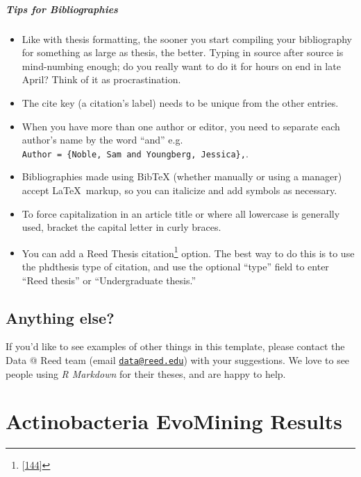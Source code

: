 \documentclass[12pt,twoside]{reedthesis}
\providecommand{\tightlist}{%
  \setlength{\itemsep}{0pt}\setlength{\parskip}{0pt}}
\begin{document}
  \paragraph{Tips for Bibliographies}\label{tips-for-bibliographies}
  
  \begin{itemize}
  \tightlist
  \item
    Like with thesis formatting, the sooner you start compiling your
    bibliography for something as large as thesis, the better. Typing in
    source after source is mind-numbing enough; do you really want to do
    it for hours on end in late April? Think of it as procrastination.
  \item
    The cite key (a citation's label) needs to be unique from the other
    entries.
  \item
    When you have more than one author or editor, you need to separate
    each author's name by the word ``and'' e.g.
    \texttt{Author\ =\ \{Noble,\ Sam\ and\ Youngberg,\ Jessica\},}.
  \item
    Bibliographies made using BibTeX (whether manually or using a manager)
    accept \LaTeX~markup, so you can italicize and add symbols as
    necessary.
  \item
    To force capitalization in an article title or where all lowercase is
    generally used, bracket the capital letter in curly braces.
  \item
    You can add a Reed Thesis citation\footnote{{[}\protect\hyperlink{ref-noble2002}{144}{]}}
    option. The best way to do this is to use the phdthesis type of
    citation, and use the optional ``type'' field to enter ``Reed thesis''
    or ``Undergraduate thesis.''
  \end{itemize}
  
  \section{Anything else?}\label{anything-else}
  
  If you'd like to see examples of other things in this template, please
  contact the Data @ Reed team (email
  \href{mailto:data@reed.edu}{\nolinkurl{data@reed.edu}}) with your
  suggestions. We love to see people using \emph{R Markdown} for their
  theses, and are happy to help.
  
  \hypertarget{refux5flabels}{\chapter{Actinobacteria EvoMining
  Results}\label{refux5flabels}}
  
\end{document}
